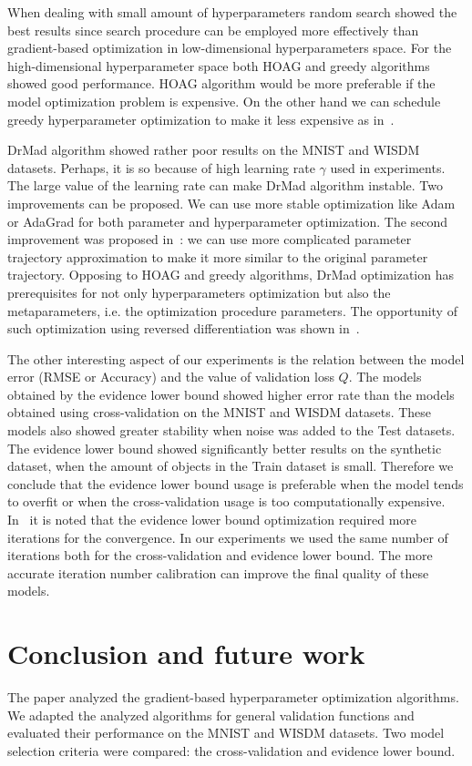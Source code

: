 \documentclass[smallextended]{svjour3}
\begin{document}
When dealing with small amount of hyperparameters random search showed the best results since search procedure can be employed more effectively than gradient-based optimization in low-dimensional hyperparameters space. For the high-dimensional hyperparameter space both  HOAG and greedy algorithms showed good performance. 
HOAG algorithm would be more preferable if the model optimization problem is expensive. On the other hand we can schedule greedy hyperparameter optimization to make it less expensive as in~\cite{hyper_greed}. 

DrMad algorithm showed rather poor results on the MNIST and WISDM datasets. Perhaps, it is so because of high learning rate $\gamma$ used in experiments. The large value of the learning rate can make DrMad algorithm instable. Two improvements can be proposed. We can use more stable optimization like Adam or AdaGrad for both parameter and hyperparameter optimization. The second improvement was proposed in~\cite{hyper_mad}: we can use more complicated parameter trajectory approximation to make it more similar to the original parameter trajectory. Opposing to HOAG and greedy algorithms, DrMad optimization has prerequisites for not only hyperparameters optimization but also the metaparameters, i.e. the optimization procedure parameters. The opportunity of such optimization using reversed differentiation was shown in~\cite{hyper_mad}. 

The other interesting aspect of our experiments is the relation between the model error (RMSE or Accuracy) and the value of validation loss $Q$. The models obtained by the evidence lower bound showed higher error rate than the models obtained using cross-validation on the MNIST and WISDM datasets. These models also showed greater stability when noise was added to the Test datasets.  The evidence lower bound showed significantly better results on the synthetic dataset, when the amount of objects in the Train dataset is small. Therefore we conclude that the evidence lower bound usage is preferable when the model tends to overfit or when the cross-validation usage is too computationally expensive.   In~\cite{nips} it is noted that the evidence lower bound optimization required more iterations for the convergence. In our experiments we used the same number of iterations both for the cross-validation and evidence lower bound. The more accurate iteration number calibration can improve the final quality of these models. 

\section{Conclusion and future work}
\label{concl}
The paper analyzed the gradient-based hyperparameter optimization algorithms. We adapted the analyzed algorithms for general validation functions and evaluated their performance on the  MNIST and WISDM datasets. Two model selection criteria were compared: the cross-validation and evidence lower bound. 
\end{document}
